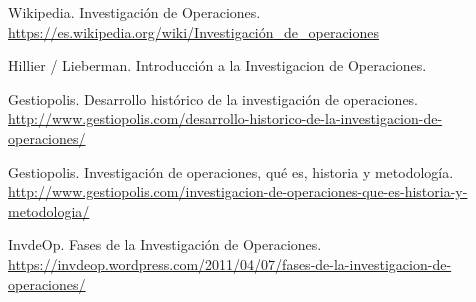 \documentclass[12pt, a4paper,spanish]{article}
\begin{document}
	\begin{thebibliography}{9}

		Wikipedia. Investigación de Operaciones. \url{https://es.wikipedia.org/wiki/Investigación_de_operaciones}

		Hillier / Lieberman. Introducción a la Investigacion de Operaciones.

		Gestiopolis. Desarrollo histórico de la investigación de operaciones. \url{http://www.gestiopolis.com/desarrollo-historico-de-la-investigacion-de-operaciones/}

		Gestiopolis. Investigación de operaciones, qué es, historia y metodología. \url{http://www.gestiopolis.com/investigacion-de-operaciones-que-es-historia-y-metodologia/}

		InvdeOp. Fases de la Investigación de Operaciones. \url{https://invdeop.wordpress.com/2011/04/07/fases-de-la-investigacion-de-operaciones/}

	\end{thebibliography}
\end{document}
